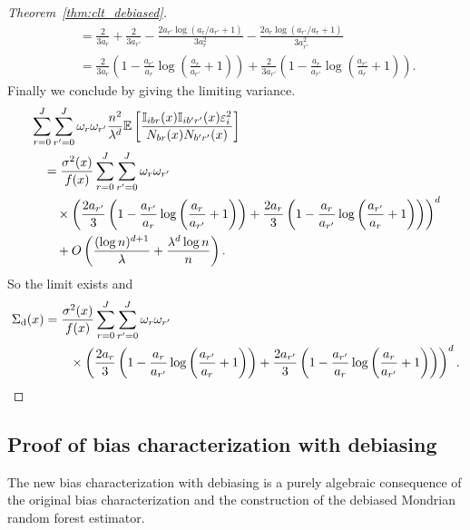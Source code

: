 \begin{proof}[Theorem~\ref{thm:clt_debiased}]
\begin{align*}
    &\quad=
    \frac{2}{3 a_r}
    + \frac{2}{3 a_{r'}}
    - \frac{2 a_{r'} \log(a_{r} / a_{r'} + 1)}{3 a_r^2}
    - \frac{2 a_r \log(a_{r'} / a_{r} + 1)}{3 a_{r'}^2} \\
    &\quad=
    \frac{2}{3 a_r}
    \left(
      1 - \frac{a_{r'}}{a_r}
      \log\left(\frac{a_{r}}{a_{r'}} + 1\right)
    \right)
    + \frac{2}{3 a_{r'}}
    \left(
      1 - \frac{a_r }{a_{r'}}
      \log\left(\frac{a_{r'}}{a_{r}} + 1\right)
    \right).
  \end{align*}
  Finally we conclude by giving the limiting variance.
  \begin{align*}
    &\sum_{r=0}^{J}
    \sum_{r'=0}^{J}
    \omega_r
    \omega_{r'}
    \frac{n^2}{\lambda^d}
    \mathbb{E} \left[
      \frac{\mathbb{I}_{i b r}(x) \mathbb{I}_{i b' r'}(x) \varepsilon_i^2}
      {N_{b r}(x) N_{b' r'}(x)}
    \right] \\
    &\quad=
    \frac{\sigma^2(x)}{f(x)}
    \sum_{r=0}^{J}
    \sum_{r'=0}^{J}
    \omega_r
    \omega_{r'} \\
    &\qquad\times
    \left(
      \frac{2 a_{r'}}{3}
      \left(
        1 - \frac{a_{r'}}{a_r}
        \log\left(\frac{a_r}{a_{r'}} + 1\right)
      \right)
      + \frac{2 a_r}{3}
      \left(
        1 - \frac{a_r}{a_{r'}}
        \log\left(\frac{a_{r'}}{a_r} + 1\right)
      \right)
    \right)^d \\
    &\qquad+
    O \left(
      \frac{(\log n)^{d+1}}{\lambda}
      + \frac{\lambda^d \log n}{n}
    \right).
  \end{align*}
  So the limit exists and
  \begin{align*}
    \Sigma_{\mathrm{d}}(x)
    &=
    \frac{\sigma^2(x)}{f(x)}
    \sum_{r=0}^{J}
    \sum_{r'=0}^{J}
    \omega_r
    \omega_{r'} \\
    &\qquad\times
    \left(
      \frac{2 a_r}{3}
      \left(
        1 - \frac{a_r}{a_{r'}}
        \log\left(\frac{a_{r'}}{a_r} + 1\right)
      \right)
      + \frac{2 a_{r'}}{3}
      \left(
        1 - \frac{a_{r'}}{a_r}
        \log\left(\frac{a_r}{a_{r'}} + 1\right)
      \right)
    \right)^d.
  \end{align*}
\end{proof}

\subsection*{Proof of bias characterization with debiasing}

The new bias characterization with debiasing is a purely algebraic
consequence of the original bias characterization and the construction
of the debiased Mondrian random forest estimator.

